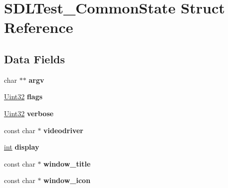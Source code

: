 \hypertarget{struct_s_d_l_test___common_state}{}\section{S\+D\+L\+Test\+\_\+\+Common\+State Struct Reference}
\label{struct_s_d_l_test___common_state}
\subsection*{Data Fields}
\begin{DoxyCompactItemize}
\item 
char $\ast$$\ast$ {\bfseries argv}\hypertarget{struct_s_d_l_test___common_state_af2efa898e9eed6fe6715279cb1ec35b0}{}\label{struct_s_d_l_test___common_state_af2efa898e9eed6fe6715279cb1ec35b0}

\item 
\hyperlink{_s_d_l__stdinc_8h_add440eff171ea5f55cb00c4a9ab8672d}{Uint32} {\bfseries flags}\hypertarget{struct_s_d_l_test___common_state_a048097c5cc2146ce1ff2450684f1b51c}{}\label{struct_s_d_l_test___common_state_a048097c5cc2146ce1ff2450684f1b51c}

\item 
\hyperlink{_s_d_l__stdinc_8h_add440eff171ea5f55cb00c4a9ab8672d}{Uint32} {\bfseries verbose}\hypertarget{struct_s_d_l_test___common_state_afb327845af3d7dff4928f07b73a54b18}{}\label{struct_s_d_l_test___common_state_afb327845af3d7dff4928f07b73a54b18}

\item 
const char $\ast$ {\bfseries videodriver}\hypertarget{struct_s_d_l_test___common_state_a0cf8c0d57d348010efdf1bf3eb776684}{}\label{struct_s_d_l_test___common_state_a0cf8c0d57d348010efdf1bf3eb776684}

\item 
\hyperlink{_s_d_l__thread_8h_a6a64f9be4433e4de6e2f2f548cf3c08e}{int} {\bfseries display}\hypertarget{struct_s_d_l_test___common_state_af36a76a97c2cc0ea7b1c0c25933934a9}{}\label{struct_s_d_l_test___common_state_af36a76a97c2cc0ea7b1c0c25933934a9}

\item 
const char $\ast$ {\bfseries window\+\_\+title}\hypertarget{struct_s_d_l_test___common_state_a69c1e671e5ad68be30a1d4001d13da16}{}\label{struct_s_d_l_test___common_state_a69c1e671e5ad68be30a1d4001d13da16}

\item 
const char $\ast$ {\bfseries window\+\_\+icon}\hypertarget{struct_s_d_l_test___common_state_a4c122f70792f5369095f6393d40c4f63}{}\label{struct_s_d_l_test___common_state_a4c122f70792f5369095f6393d40c4f63}


\end{DoxyCompactItemize}
